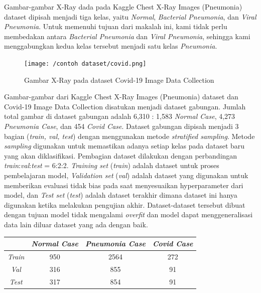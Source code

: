 \documentclass{article}
\begin{document}
	\par
	Gambar-gambar X-Ray dada pada Kaggle Chest X-Ray Images (Pneumonia) dataset dipisah menjadi tiga kelas, yaitu \textit{Normal}, \textit{Bacterial Pneumonia}, dan \textit{Viral Pneumonia}. Untuk memenuhi tujuan dari makalah ini, kami tidak perlu membedakan antara \textit{Bacterial Pneumonia} dan \textit{Viral Pneumonia}, sehingga kami menggabungkan kedua kelas tersebut menjadi satu kelas \textit{Pneumonia}.
	\par
	
	\begin{figure}[H]
		\centering
		\texttt{[image: /contoh dataset/covid.png]}
		\caption{Gambar X-Ray pada dataset Covid-19 Image Data Collection}
	\end{figure}   
	    
	\par
	Gambar-gambar dari Kaggle Chest X-Ray Images (Pneumonia) dataset dan Covid-19 Image Data Collection disatukan menjadi dataset gabungan. Jumlah total gambar di dataset gabungan adalah 6,310 : 1,583 \textit{Normal Case}, 4,273 \textit{Pneumonia Case}, dan 454 \textit{Covid Case}. Dataset gabungan dipisah menjadi 3 bagian (\textit{train, val, test}) dengan menggunakan metode \textit{stratified 
	sampling}. Metode \textit{sampling} digunakan untuk memastikan adanya setiap kelas pada dataset baru yang 
	akan diklasifikasi. Pembagian dataset dilakukan dengan  perbandingan \textit{train}:\textit{val}:\textit{test} = 6:2:2. \textit{Training set} (\textit{train})
	adalah dataset untuk proses pembelajaran model, \textit{Validation set} (\textit{val}) adalah dataset yang digunakan 
	untuk memberikan evaluasi tidak bias pada saat menyesuaikan hyperparameter dari model, dan \textit{Test 
	set} (\textit{test}) adalah dataset terakhir dimana dataset ini hanya digunakan ketika melakukan pengujian 
	akhir. Dataset-dataset tersebut dibuat dengan tujuan model tidak mengalami \textit{overfit} dan model dapat 
	menggeneralisasi data lain diluar dataset yang ada dengan baik.

   	\begin{center}
		\begin{tabular}{|c|c|c|c|}
			\hline
			& \textit{Normal Case} & \textit{Pneumonia Case} & \textit{Covid Case} \\
			\hline
			\textit{Train} & 950 & 2564 & 272 \\
			\hline
			\textit{Val} & 316 & 855 & 91 \\
			\hline
			\textit{Test} & 317 & 854 & 91 \\
			\hline
		\end{tabular}
	\end{center}
	
\end{document}
